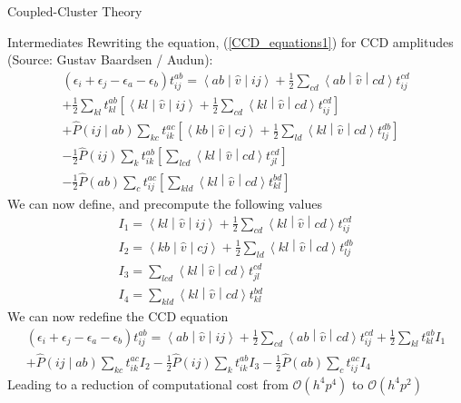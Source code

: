 \documentclass[twoside,english]{uiofysmaster}
\begin{document}
\begin{chapter}{Coupled-Cluster Theory}
\begin{section}{Intermediates}
  		Rewriting the equation, (\ref{CCD_equations1}) for CCD amplitudes (Source: Gustav Baardsen / Audun):
  		\begin{align}
  			(\epsilon_i + \epsilon_j - \epsilon_a - \epsilon_b) t_{ij}^{ab} = \left<ab\middle|\hat v\middle|ij\right> + \frac{1}{2} \sum_{cd}\left<ab\middle|\hat v\middle|cd\right>t_{ij}^{cd} \\
  			+ \frac{1}{2} \sum_{kl} t_{kl}^{ab} \left[ \left<kl\middle|\hat v\middle|ij\right> + \frac{1}{2} \sum_{cd} \left<kl\middle|\hat v\middle|cd\right> t_{ij}^{cd} \right] \\
  			+ \hat P\left(ij\middle|ab\right) \sum_{kc} t_{ik}^{ac} \left[ \left<kb\middle|\hat v\middle|cj\right> + \frac{1}{2}\sum_{ld}\left<kl\middle|\hat v\middle|cd\right>t_{lj}^{db} \right] \\
  			- \frac{1}{2} \hat P(ij) \sum_{k} t_{ik}^{ab} \left[ \sum_{lcd} \left<kl\middle|\hat v\middle|cd\right> t_{jl}^{cd} \right] \\
  			- \frac{1}{2} \hat P(ab) \sum_{c} t_{ij}^{ac} \left[ \sum_{kld} \left<kl\middle|\hat v\middle|cd\right> t_{kl}^{bd} \right]
  		\end{align}
  		We can now define, and precompute the following values
  		\begin{align}
  			I_1 = \left<kl\middle|\hat v\middle|ij\right> + \frac{1}{2} \sum_{cd} \left<kl\middle|\hat v\middle|cd\right> t_{ij}^{cd} \\
  			I_2 = \left<kb\middle|\hat v\middle|cj\right> + \frac{1}{2}\sum_{ld}\left<kl\middle|\hat v\middle|cd\right>t_{lj}^{db} \\
  			I_3 = \sum_{lcd} \left<kl\middle|\hat v\middle|cd\right> t_{jl}^{cd} \\
  			I_4 = \sum_{kld} \left<kl\middle|\hat v\middle|cd\right> t_{kl}^{bd}
  		\end{align}
  		We can now redefine the CCD equation 
  		\begin{align}
  			(\epsilon_i + \epsilon_j - \epsilon_a - \epsilon_b) t_{ij}^{ab} = \left<ab\middle|\hat v\middle|ij\right> + \frac{1}{2} \sum_{cd}\left<ab\middle|\hat v\middle|cd\right>t_{ij}^{cd} + \frac{1}{2} \sum_{kl} t_{kl}^{ab} I_1 \\
  			+ \hat P\left(ij\middle|ab\right) \sum_{kc} t_{ik}^{ac} I_2 - \frac{1}{2} \hat P(ij) \sum_{k} t_{ik}^{ab} I_3  - \frac{1}{2} \hat P(ab) \sum_{c} t_{ij}^{ac} I_4
  			\label{Intermediates}
  		\end{align}
  		Leading to a reduction of computational cost from $\mathcal{O}(h^4 p^4)$ to $\mathcal{O}(h^4 p^2)$


  	\end{section}

\end{chapter}
\end{document}
